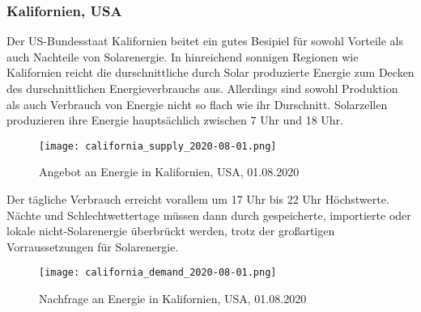     \subsubsection{Kalifornien, USA}
        Der US-Bundesstaat Kalifornien beitet ein gutes Besipiel für sowohl
        Vorteile als auch Nachteile von Solarenergie. In hinreichend sonnigen
        Regionen wie Kalifornien reicht die durschnittliche durch Solar
        produzierte Energie zum Decken des durschnittlichen Energieverbrauchs
        aus. Allerdings sind sowohl Produktion als auch Verbrauch von
        Energie nicht so flach wie ihr Durschnitt. Solarzellen produzieren
        ihre Energie hauptsächlich zwischen 7 Uhr und 18 Uhr.
        \begin{figure}[H]
            \centering
            \texttt{[image: california\_supply\_2020-08-01.png]}
            \caption{Angebot an Energie in Kalifornien, USA, 01.08.2020
                \cite{Img_CaliforniaSupply}
            }
        \end{figure}
        \noindent
        Der tägliche Verbrauch erreicht vorallem um 17 Uhr bis 22 Uhr Höchstwerte.
        Nächte und Schlechtwettertage müssen dann durch gespeicherte, importierte
        oder lokale nicht-Solarenergie überbrückt werden, trotz der großartigen
        Vorraussetzungen für Solarenergie. \cite{SolarCalifornia}
        \cite{YouTube_RE-California}
        \begin{figure}[H]
            \centering
            \texttt{[image: california\_demand\_2020-08-01.png]}
            \caption{Nachfrage an Energie in Kalifornien, USA, 01.08.2020
                \cite{Img_CaliforniaDemand}
            }
        \end{figure}
